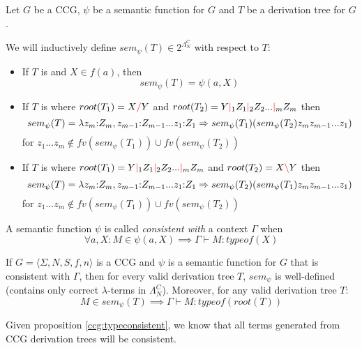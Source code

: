 \documentclass[main.tex]{subfiles}
\begin{document}
\begin{defn}
    Let $G$ be a CCG, $\psi$ be a semantic function for $G$ and $T$ be a
    derivation tree for $G$.

    We will inductively define $sem_{\psi}(T) \in 2^{\Lambda_N^C}$ with
    respect to $T$:
    \begin{itemize}
        \item If $T$ is
            and $X \in f(a)$, then
            \[ sem_{\psi}(T) = \psi(a, X) \]
        \item If $T$ is
            where $root(T_1) = X \textcolor{red}{/} Y$ and $root(T_2) = Y \textcolor{red}{|}_1 Z_1 \textcolor{red}{|}_2 Z_2 ... \textcolor{red}{|}_m Z_m$ then
            \[ sem_{\psi}(T) = \lambda z_m {:} Z_m, z_{m - 1} {:} Z_{m - 1} ... z_1 {:} Z_1 \Rightarrow
                sem_{\psi}(T_1) ( sem_{\psi}(T_2) z_m z_{m - 1} ... z_1 ) \]
            for $z_1 ... z_m \not\in fv(sem_{\psi}(T_1)) \cup fv(sem_{\psi}(T_2))$
        \item If $T$ is
            where $root(T_1) = Y \textcolor{red}{|}_1 Z_1 \textcolor{red}{|}_2 Z_2 ... \textcolor{red}{|}_m Z_m$ and $root(T_2) = X \textcolor{red}{\backslash} Y$ then
            \[ sem_{\psi}(T) = \lambda z_m {:} Z_m, z_{m - 1} {:} Z_{m - 1} ... z_1 {:} Z_1 \Rightarrow
                sem_{\psi}(T_2) ( sem_{\psi}(T_1) z_m z_{m - 1} ... z_1 ) \]
            for $z_1 ... z_m \not\in fv(sem_{\psi}(T_1)) \cup fv(sem_{\psi}(T_2))$
    \end{itemize}
\end{defn}

\begin{defn}
    A semantic function $\psi$ is called \emph{consistent with} a context
    $\Gamma$ when
    \[
        \forall a, X: M \in \psi(a, X) \implies \Gamma \vdash M : typeof(X)
    \]
\end{defn}

\begin{prop}
    \label{ccg:typeconsistent}
    If $ G = \langle \Sigma, N, S, f, n \rangle $ is a CCG and $\psi$ is a
    semantic function for $G$ that is consistent with $\Gamma$, then
    for every valid derivation tree $T$, $sem_{\psi}$ is well-defined (contains
    only correct $\lambda$-terms in $\Lambda_N^C$). Moreover, for any valid
    derivation tree $T$:
    \[
        M \in sem_{\psi}(T) \implies \Gamma \vdash M : typeof(root(T))
    \]
\end{prop}

Given proposition \autoref{ccg:typeconsistent}, we know that all terms generated
from CCG derivation trees will be consistent.
\end{document}
